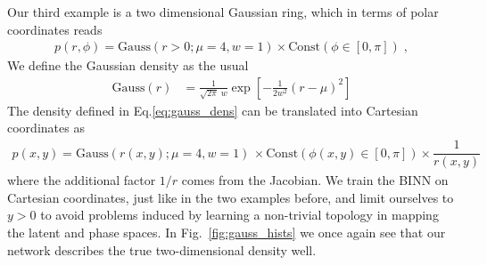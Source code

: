 Our third example is a two dimensional Gaussian ring, which in terms
of polar coordinates reads
%
\begin{align}
p(r, \phi) = \text{Gauss}(r > 0; \mu=4, w=1) \times \text{Const}(\phi \in [0, \pi]) \; ,
\label{eq:gauss_dens}
\end{align}
%
We define the Gaussian density as the usual
%
\begin{align}
  \text{Gauss}(r)
&=  \frac{1}{\sqrt{2 \pi} \; w} \exp \left[ - \frac{1}{2 w^2} (r-\mu)^2 \right]
\end{align}
%
The density defined in Eq.\eqref{eq:gauss_dens} can be translated into
Cartesian coordinates as
%
\begin{align}
p(x, y) = \text{Gauss}(r(x, y);\mu=4, w=1) \, \times \text{Const}(\phi(x, y) \in [0, \pi]) \times \dfrac{1}{r(x, y)}
\end{align}
%
where the additional factor $1/r$ comes from the Jacobian. We train
the BINN on Cartesian coordinates, just like in the two examples
before, and limit ourselves to $y>0$ to avoid problems induced by
learning a non-trivial topology in mapping the latent and phase
spaces.  In Fig.~\ref{fig:gauss_hists} we once again see that our
network describes the true two-dimensional density well.

